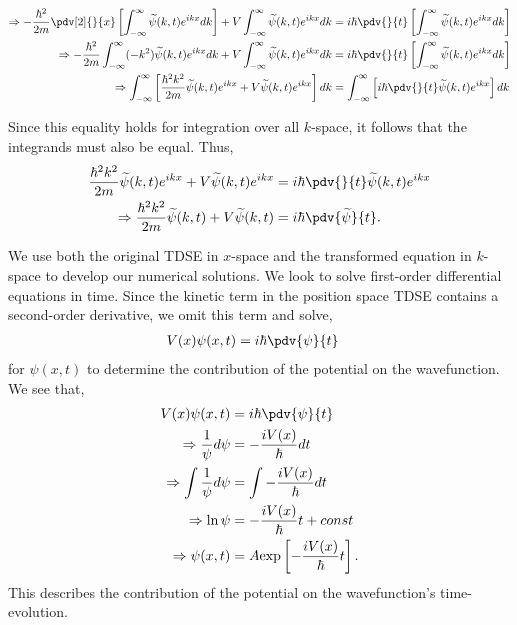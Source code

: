\documentclass{booknotes}
\begin{document}
	\begin{align}
	\Rightarrow 
	-\frac {  \hbar ^ { 2 } } { 2 m } \pdv[2]{}{x}
	\left[ \int _ { - \infty } ^ { \infty } \widetilde { \psi } ( k , t ) e ^ { i k x } d k \right]
	+ V  \int _ { - \infty } ^ { \infty } \widetilde { \psi } ( k , t ) e ^ { i k x } d k 
	&= i \hbar \pdv{}{t}
	\left[ \int _ { - \infty } ^ { \infty } \widetilde { \psi } ( k , t ) e ^ { i k x } d k \right]\\
	\Rightarrow -\frac {  \hbar ^ { 2 } } { 2 m }
	\int _ { - \infty } ^ { \infty } (-k^2) \widetilde { \psi } ( k , t ) e ^ { i k x } d k
	+ V  \int _ { - \infty } ^ { \infty } \widetilde { \psi } ( k , t ) e ^ { i k x } d k 
	&= i \hbar \pdv{}{t}
	\left[ \int _ { - \infty } ^ { \infty } \widetilde { \psi } ( k , t ) e ^ { i k x } d k \right]\\
	\Rightarrow  \int _ { - \infty } ^ { \infty } \left[
	\frac{\hbar^2 k^2}{2m} \widetilde { \psi } ( k , t ) e ^ { i k x } 
	+ V \widetilde { \psi } ( k , t ) e ^ { i k x } \right]  dk
	&= \int _ { - \infty } ^ { \infty } \left[
	i \hbar \pdv{}{t} \widetilde { \psi } ( k , t )e ^ { i k x } \right] d k 
	\end{align}

Since this equality holds for integration over all $k$-space, it follows that the integrands must also be equal. Thus,
	\begin{align}
	\frac{\hbar^2 k^2}{2m} \widetilde { \psi } ( k , t ) e ^ { i k x } 
	+ V \widetilde { \psi } ( k , t ) e ^ { i k x }
	&=
	i \hbar \pdv{}{t} \widetilde { \psi } ( k , t )e ^ { i k x }\\
	\Rightarrow \frac{\hbar^2 k^2}{2m} \widetilde { \psi } ( k , t ) 
	+ V \widetilde { \psi } ( k , t ) 
	&=
	i \hbar \pdv{\widetilde { \psi }}{t}.\\
	\end{align}

We use both the original TDSE in $x$-space and the transformed equation in $k$-space to develop our numerical solutions. We look to solve first-order differential equations in time. 
Since the kinetic term in the position space TDSE contains a second-order derivative, we omit this term and solve,
	\begin{align}
	V(x) \psi(x,t) &= i \hbar \pdv{\psi}{t} 
	\end{align}
for $\psi(x,t)$ to determine the contribution of the potential on the wavefunction. 
We see that,
	\begin{align}
	V(x) \psi(x,t) &= i \hbar \pdv{\psi}{t} \\
	\Rightarrow \frac{1}{\psi} d\psi &= -\frac{iV(x)}{\hbar} dt\\
	\Rightarrow \int  \frac{1}{\psi} d\psi &= \int -\frac{iV(x)}{\hbar} dt\\
	\Rightarrow \ln \psi &= -\frac{iV(x)}{\hbar} t + const\\
	\Rightarrow \psi(x,t) &= A \text{exp} \left[-\frac{iV(x)}{\hbar} t \right].
	\end{align}
This describes the contribution of the potential on the wavefunction's time-evolution.
\end{document}
